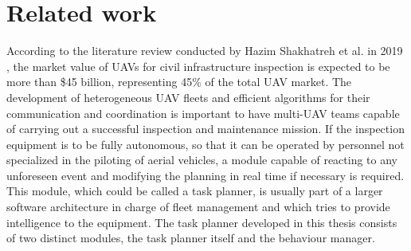 \section{Related work}
\label{sec:RelatedWork}
According to the literature review conducted by Hazim Shakhatreh et al. in 2019 \cite{CivilAplications}, the market value of \glspl{UAV} for civil infrastructure inspection is expected to be more than \$45 billion, representing 45\% of the total \gls{UAV} market. The development of heterogeneous \gls{UAV} fleets and efficient algorithms for their communication and coordination is important to have multi-\gls{UAV} teams capable of carrying out a successful inspection and maintenance mission. If the inspection equipment is to be fully autonomous, so that it can be operated by personnel not specialized in the piloting of aerial vehicles, a module capable of reacting to any unforeseen event and modifying the planning in real time if necessary is required. This module, which could be called a task planner, is usually part of a larger software architecture in charge of fleet management and which tries to provide intelligence to the equipment. The task planner developed in this thesis consists of two distinct modules, the task planner itself and the behaviour manager.

